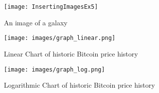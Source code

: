 \begin{figure}[htp]
    \centering
    \texttt{[image: InsertingImagesEx5]}
    \caption{An image of a galaxy}
    \label{fig:galaxy}
\end{figure}



\begin{figure}[h]
  \centering
  \begin{minipage}[b]{0.4\textwidth}
    \texttt{[image: images/graph\_linear.png]}
    \caption{Linear Chart of historic Bitcoin price history}
  \end{minipage}
  \hfill
  \begin{minipage}[b]{0.4\textwidth}
    \texttt{[image: images/graph\_log.png]}
    \caption{Logarithmic Chart of historic Bitcoin price history}
  \end{minipage}
\end{figure}